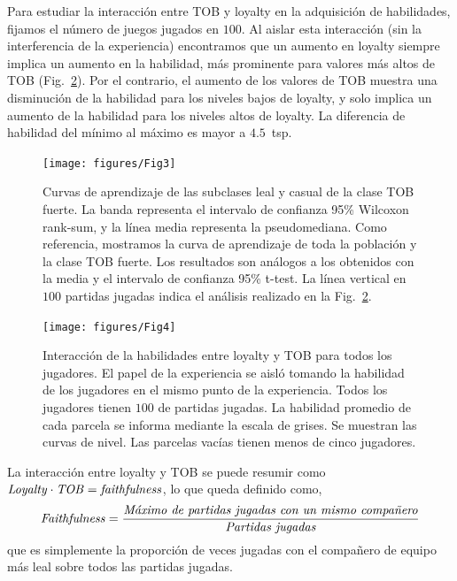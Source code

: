 \documentclass[a4paper,11pt]{book}
\theoremstyle{definition}
\begin{document}
Para estudiar la interacci\'on entre TOB y loyalty en la adquisici\'on de habilidades, fijamos el n\'umero de juegos jugados en $100$.
%
Al aislar esta interacci\'on (sin la interferencia de la experiencia) encontramos que un aumento en loyalty siempre implica un aumento en la habilidad, m\'as prominente para valores m\'as altos de TOB (Fig.~\ref{skillModels_loyaltyTeamOriented_imageEmpirical}).
%
Por el contrario, el aumento de los valores de TOB muestra una disminuci\'on de la habilidad para los niveles bajos de loyalty, y solo implica un aumento de la habilidad para los niveles altos de loyalty.
%
La diferencia de habilidad del m\'inimo al m\'aximo es mayor a $4.5$~tsp.

\clearpage
\begin{figure}[ht!]
\centering
\texttt{[image: figures/Fig3]}
\caption{
Curvas de aprendizaje de las subclases leal y casual de la clase TOB fuerte.
%
La banda representa el intervalo de confianza 95\% Wilcoxon rank-sum, y la l\'inea media representa la pseudomediana.
%
Como referencia, mostramos la curva de aprendizaje de toda la poblaci\'on y la clase TOB fuerte.
%
Los resultados son an\'alogos a los obtenidos con la media y el intervalo de confianza 95\% t-test.
%
La l\'inea vertical en $100$ partidas jugadas indica el an\'alisis realizado en la Fig.~\protect\ref{skillModels_loyaltyTeamOriented_imageEmpirical}.
}
\label{learningskill_pteam89_ployal}
\end{figure}

\begin{figure}[ht!]
\centering
\texttt{[image: figures/Fig4]}
\caption{
Interacci\'on de la habilidades entre loyalty y TOB para todos los jugadores.
%
El papel de la experiencia se aisl\'o tomando la habilidad de los jugadores en el mismo punto de la experiencia.
%
Todos los jugadores tienen $100$ de partidas jugadas.
%
La habilidad promedio de cada parcela se informa mediante la escala de grises.
%
Se muestran las curvas de nivel.
%
Las parcelas vac\'ias tienen menos de cinco jugadores.
}
\label{skillModels_loyaltyTeamOriented_imageEmpirical}
\end{figure}

La interacci\'on entre loyalty y TOB se puede resumir como $ \text{\emph{Loyalty}} \cdot \text{\emph{TOB}} = \text{\emph{faithfulness}}$, lo que queda definido como,
%
\begin{equation}
\text{\emph{Faithfulness}} = \frac{\text{\emph{M\'aximo de partidas jugadas con un mismo compa\~nero}}}{\text{\emph{Partidas jugadas}}}
\end{equation}
%
que es simplemente la proporci\'on de veces jugadas con el compa\~nero de equipo m\'as leal sobre todos las partidas jugadas.
\end{document}
